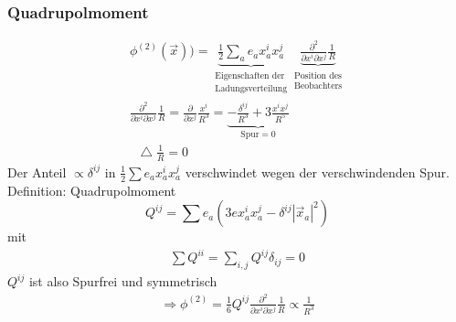 \documentclass[a4paper]{article}
\newcommand*\laplace{\mathop{}\!\mathbin\bigtriangleup}
\begin{document}
\subsubsection{Quadrupolmoment}
\begin{align}
\phi^{(2)}(\vec{x}))=\underbrace{\frac{1}{2}\sum_a e_a x_a^i
x_a^j}_{\substack{\text{Eigenschaften der}\\\text{Ladungsverteilung}}}
\underbrace{ \frac{\partial^2}{\partial x^i \partial x^j}
\frac{1}{R}}_{\substack{\text{Position des}\\ \text{Beobachters}}}\\
\frac{\partial^2}{\partial x^i \partial x^j} \frac{1}{R}
=\frac{\partial}{\partial x^j} \frac{x^i}{R^3}= \underbrace{
-\frac{\delta^{ij}}{R^3} + 3 \frac{x^ix^j}{R^5}}_{\text{Spur} = 0}\\
\laplace \frac{1}{R}=0
\end{align}
Der Anteil $\propto \delta^{ij}$ in $\frac{1}{2}\sum e_a x_a^i x_a^j$
verschwindet wegen der verschwindenden Spur.\\
Definition: Quadrupolmoment
\begin{equation}
Q^{ij}=\sum e_a \left( 3e x_a^i x_a^j-\delta^{ij} |\vec{x}_a|^2\right)
\end{equation}
mit 
\begin{align}
\sum Q^{ii}=\sum_{i,j} Q^{ij}\delta_{ij}=0
\end{align}
$Q^{ij}$ ist also Spurfrei und symmetrisch
\begin{align}
\Rightarrow \phi^{(2)}=\frac{1}{6}Q^{ij} \frac{\partial^2}{\partial x^i
\partial x^j} \frac{1}{R} \propto \frac{1}{R^3}
\end{align}
\end{document}
